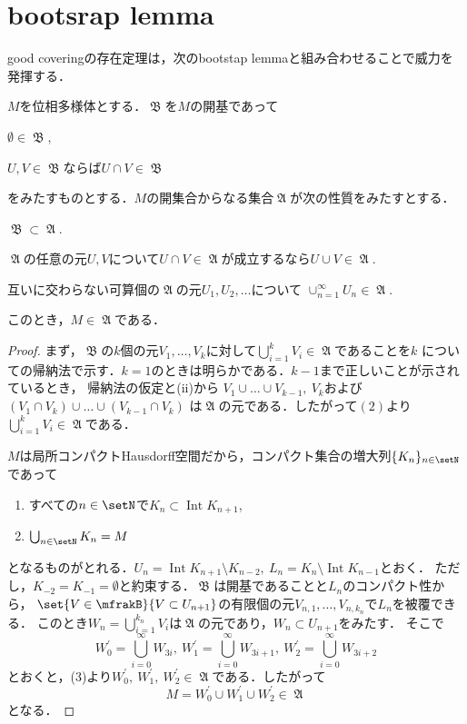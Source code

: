 \documentclass[uplatex]{jsarticle}
\DeclareMathOperator{\Int}{Int}
\begin{document}
\section{bootsrap lemma}

good coveringの存在定理は，次のbootstap lemmaと組み合わせることで威力を発揮する．

\begin{theorem}
  $M$を位相多様体とする．$\mfrakB$を$M$の開基であって
  \begin{enumromanp}
    \item $\emptyset\in \mfrakB$,
    \item $U, V\in \mfrakB$ならば$U\cap V \in \mfrakB$
  \end{enumromanp}
  をみたすものとする．$M$の開集合からなる集合$\mfrakA$が次の性質をみたすとする．
  \begin{enumarabicp}
    \item $\mfrakB\subset \mfrakA$.
    \item $\mfrakA$の任意の元$U, V$について$U\cap V\in \mfrakA$が成立するなら$U\cup V\in \mfrakA$.
    \item 互いに交わらない可算個の$\mfrakA$の元$U_1, U_2, \dots$について
    $\cup_{n=1}^\infty U_n\in \mfrakA$.
  \end{enumarabicp}
  このとき，$M\in \mfrakA$である．
\end{theorem}

\begin{proof}
  まず，$\mfrakB$の$k$個の元$V_1, \dots, V_k$に対して$\bigcup_{i=1}^k V_i\in \mfrakA$であることを$k$
  についての帰納法で示す．$k=1$のときは明らかである．$k-1$まで正しいことが示されているとき，
  帰納法の仮定と(ii)から
  $V_1\cup\dots\cup V_{k-1},\ V_k$および$(V_1\cap V_k)\cup\dots \cup (V_{k-1}\cap V_k)$
  は$\mfrakA$の元である．したがって$(2)$より$\bigcup_{i=1}^k V_i\in\mfrakA$である．

  $M$は局所コンパクトHausdorff空間だから，コンパクト集合の増大列$\{K_n\}_{n\in \setN}$
  であって
  \begin{enumerate}
    \item すべての$n\in\setN$で$K_n\subset \Int K_{n+1}$,
    \item $\bigcup_{n\in\setN} K_n = M$
  \end{enumerate}
  となるものがとれる．$U_{n}=\Int K_{n+1}\setminus K_{n-2},\ L_n=K_n\setminus \Int K_{n-1}$とおく．
  ただし，$K_{-2}=K_{-1}=\emptyset$と約束する．$\mfrakB$は開基であることと$L_n$のコンパクト性から，
  $\set{V\in\mfrakB}{V\subset U_{n+1}}$の有限個の元$V_{n,1},\dots, V_{n,k_n}$で$L_n$を被覆できる．
  このとき$W_n=\bigcup_{i=1}^{k_n} V_i$は$\mfrakA$の元であり，$W_n\subset U_{n+1}$をみたす．
  そこで
    \[W^\prime_0=\bigcup_{i=0}^\infty W_{3i},\  W^\prime_1=\bigcup_{i=0}^\infty W_{3i+1},\ 
      W^\prime_2=\bigcup_{i=0}^\infty W_{3i+2}\]
  とおくと，(3)より$W^\prime_0,\ W^\prime_1,\ W^\prime_2\in\mfrakA$である．したがって
    \[M=W^\prime_0\cup W^\prime_1\cup W^\prime_2\in\mfrakA\]
  となる．
\end{proof}
\end{document}
